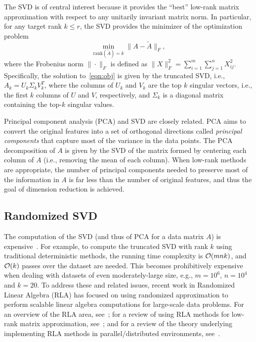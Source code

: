  
The SVD is of central interest because it provides the ``best'' low-rank matrix approximation with respect to any unitarily invariant matrix norm.
In particular, for any target rank $k \leq r$, the SVD provides the minimizer of the optimization problem
\begin{equation}
 \label{eqn:obj}
  \min_{\text{rank}(\tilde A) = k} \| A - \tilde A \|_F,
\end{equation}
where the Frobenius norm $\| \cdot \|_F$ is defined as $\|X\|_F^2 =
\sum_{i=1}^m \sum_{j=1}^n X_{ij}^2 $. Specifically, the solution
to~\eqref{eqn:obj} is given by the truncated SVD, i.e., $A_k = U_k \Sigma_k
V_k^T$, where the columns of $U_k$ and $V_k$ are the top $k$ singular vectors,
i.e., the first $k$ columns of $U$ and $V$, respectively, and $\Sigma_k$ is a 
diagonal matrix containing the top-$k$ singular values.

Principal component analysis (PCA) and SVD are closely related.  PCA aims to
convert the original features into a set of orthogonal directions called {\it
principal components} that capture most of the variance in the data points.
The PCA decomposition of $A$ is given by the SVD of the matrix formed by
centering each column of $A$ (i.e., removing the mean of each column).  When
low-rank methods are appropriate, the number of principal components needed to
preserve most of the information in $A$ is far less than the number of original
features, and thus the goal of dimension reduction is achieved.

\subsection{Randomized SVD}

The computation of the SVD (and thus of PCA for a data matrix $A$) is
expensive~\cite{GVL96}.  For example, to compute the truncated SVD with rank
$k$ using traditional deterministic methods, the running time complexity is
$\operatorname{\mathcal{O}}(mnk)$, and $\operatorname{\mathcal{O}}(k)$ passes over the dataset are needed.  This becomes
prohibitively expensive when dealing with datasets of even moderately-large
size, e.g., $m = 10^6$, $n = 10^4$ and $k = 20$.  To address these and related
issues, recent work in Randomized Linear Algebra (RLA) has focused on using
randomized approximation to perform scalable linear algebra computations for
large-scale data problems.  For an overview of the RLA area,
see~\cite{Mah-mat-rev_BOOK}; for a review of using RLA methods for low-rank
matrix approximation, see~\cite{HMT09_SIREV}; and for a review of the theory
underlying implementing RLA methods in parallel/distributed environments,
see~\cite{YMM15_TR}.

